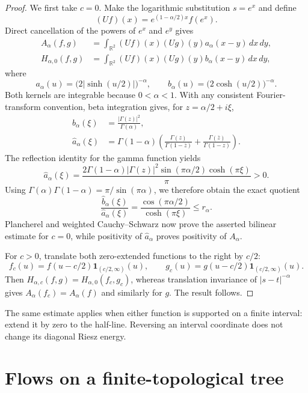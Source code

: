 \documentclass[11pt]{article}
\newcommand{\R}{\mathbb R}
\begin{document}
\begin{proof}
We first take $c=0$.  Make the logarithmic substitution $s=e^x$ and define
\[
  (Uf)(x)=e^{(1-\alpha/2)x}f(e^x).
\]
Direct cancellation of the powers of $e^x$ and $e^y$ gives
\begin{align*}
 A_\alpha(f,g)
 &=\int_{\R^2}(Uf)(x)(Ug)(y)a_\alpha(x-y)\,dx\,dy,\\
 H_{\alpha,0}(f,g)
 &=\int_{\R^2}(Uf)(x)(Ug)(y)b_\alpha(x-y)\,dx\,dy,
\end{align*}
where
\[
 a_\alpha(u)=\bigl(2|\sinh(u/2)|\bigr)^{-\alpha},
 \qquad
 b_\alpha(u)=\bigl(2\cosh(u/2)\bigr)^{-\alpha}.
\]
Both kernels are integrable because $0<\alpha<1$.  With any consistent
Fourier-transform convention, beta integration gives, for
$z=\alpha/2+i\xi$,
\begin{align*}
 \widehat b_\alpha(\xi)
 &=\frac{|\Gamma(z)|^2}{\Gamma(\alpha)},\\
 \widehat a_\alpha(\xi)
 &=\Gamma(1-\alpha)
 \left(
 \frac{\Gamma(z)}{\Gamma(1-\overline z)}
 +\frac{\Gamma(\overline z)}{\Gamma(1-z)}
 \right).
\end{align*}
The reflection identity for the gamma function yields
\[
 \widehat a_\alpha(\xi)
 =\frac{2\Gamma(1-\alpha)|\Gamma(z)|^2
          \sin(\pi\alpha/2)\cosh(\pi\xi)}{\pi}>0.
\]
Using $\Gamma(\alpha)\Gamma(1-\alpha)=\pi/\sin(\pi\alpha)$,
we therefore obtain the exact quotient
\begin{equation}\label{eq:ratio}
 \frac{\widehat b_\alpha(\xi)}{\widehat a_\alpha(\xi)}
 =\frac{\cos(\pi\alpha/2)}{\cosh(\pi\xi)}
 \le r_\alpha.
\end{equation}
Plancherel and weighted Cauchy--Schwarz now prove the asserted bilinear
estimate for $c=0$, while positivity of $\widehat a_\alpha$ proves positivity
of $A_\alpha$.

For $c>0$, translate both zero-extended functions to the right by $c/2$:
\[
 f_c(u)=f(u-c/2)\mathbf 1_{(c/2,\infty)}(u),
 \qquad
 g_c(u)=g(u-c/2)\mathbf 1_{(c/2,\infty)}(u).
\]
Then $H_{\alpha,c}(f,g)=H_{\alpha,0}(f_c,g_c)$, whereas translation
invariance of $|s-t|^{-\alpha}$ gives
$A_\alpha(f_c)=A_\alpha(f)$ and similarly for $g$.  The result follows.
\end{proof}

The same estimate applies when either function is supported on a finite
interval: extend it by zero to the half-line.  Reversing an interval coordinate
does not change its diagonal Riesz energy.

\section{Flows on a finite-topological tree}
\end{document}
